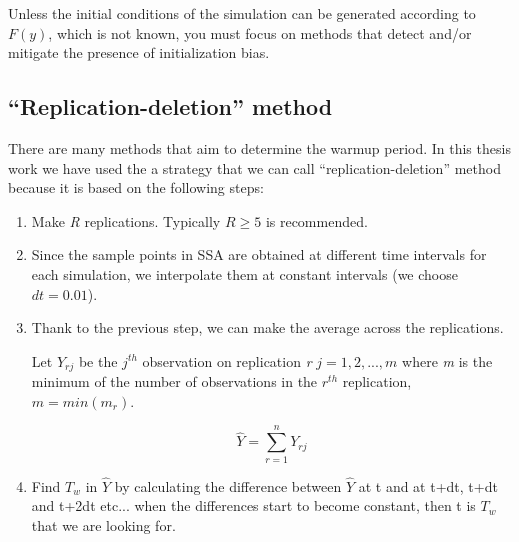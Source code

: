 \documentclass[12pt,a4paper]{report}
\begin{document}
Unless the initial conditions of the simulation can be generated according to $F(y)$, which is not known, you must focus on methods that detect and/or mitigate the presence of initialization bias.













\subsection{``Replication-deletion'' method}
There are many methods that aim to determine the warmup period. In this thesis work we have used the a strategy that we can call ``replication-deletion'' method because it is based on the following steps:
\begin{enumerate}
 \item Make \emph{R} replications. Typically $R \geq 5$ is recommended.
 \item Since the sample points in SSA are obtained at different time intervals for each simulation, we interpolate them at constant intervals (we choose $dt=0.01$).
 \item Thank to the previous step, we can make the average across the replications. 
 
 Let $Y_{rj}$ be the $j^{th}$ observation on replication \emph{r} $j=1,2,...,m$ where \emph{m} is the minimum of the number of observations in the $r^{th}$ replication, $m=min(m_{r})$.
 
 \begin{equation}
  \hat{Y}=\sum_{r=1}^{n} Y_{rj}
 \end{equation}
 
 \item Find $T_{w}$ in $\hat{Y}$ by calculating the difference between $\hat{Y}$ at t and at t+dt, t+dt and t+2dt etc... when the differences start to become constant, then t is $T_{w}$ that we are looking for.

\end{enumerate}
\end{document}
